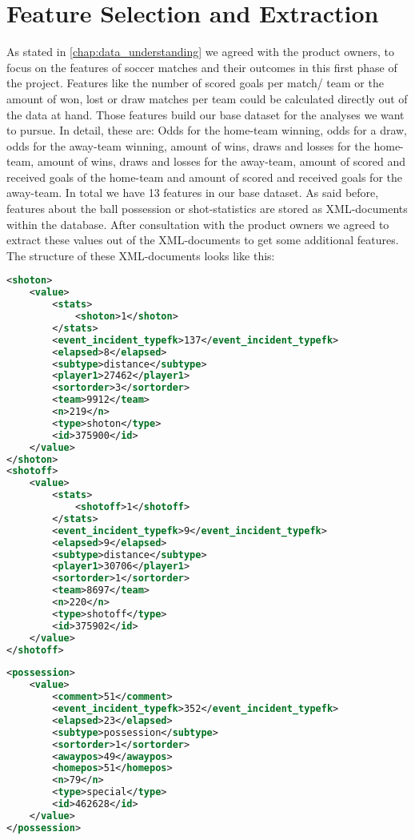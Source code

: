 
\chapter{Feature Selection and Extraction}
\label{chap:feature_selection_and_extraction}
As stated in \autoref{chap:data_understanding} we agreed with the product owners, to focus on the features of soccer matches and their outcomes in this first phase of the project. Features like the number of scored goals per match/ team or the amount of won, lost or draw matches per team could be calculated directly out of the data at hand. Those features build our base dataset for the analyses we want to pursue. In detail, these are: Odds for the home-team winning, odds for a draw, odds for the away-team winning, amount of wins, draws and losses for the home-team, amount of wins, draws and losses for the away-team, amount of scored and received goals of the home-team and amount of scored and received goals for the away-team. In total we have 13 features in our base dataset.
\newline
As said before, features about the ball possession or shot-statistics are stored as XML-documents within the database. After consultation with the product owners we agreed to extract these values out of the XML-documents to get some additional features. The structure of these XML-documents looks like this:
\\
\begin{lstlisting}[language=XML, caption=xml structure of shot-statistics]
<shoton>
	<value>
		<stats>
			<shoton>1</shoton>
		</stats>
		<event_incident_typefk>137</event_incident_typefk>
		<elapsed>8</elapsed>
		<subtype>distance</subtype>
		<player1>27462</player1>
		<sortorder>3</sortorder>
		<team>9912</team>
		<n>219</n>
		<type>shoton</type>
		<id>375900</id>
	</value>
</shoton>
<shotoff>
	<value>
		<stats>
			<shotoff>1</shotoff>
		</stats>
		<event_incident_typefk>9</event_incident_typefk>
		<elapsed>9</elapsed>
		<subtype>distance</subtype>
		<player1>30706</player1>
		<sortorder>1</sortorder>
		<team>8697</team>
		<n>220</n>
		<type>shotoff</type>
		<id>375902</id>
	</value>
</shotoff>
\end{lstlisting}

\begin{lstlisting}[language=XML, caption=xml structure of ball-possession-statistics]
<possession>
	<value>
		<comment>51</comment>
		<event_incident_typefk>352</event_incident_typefk>
		<elapsed>23</elapsed>
		<subtype>possession</subtype>
		<sortorder>1</sortorder>
		<awaypos>49</awaypos>
		<homepos>51</homepos>
		<n>79</n>
		<type>special</type>
		<id>462628</id>
	</value>
</possession>
\end{lstlisting}

